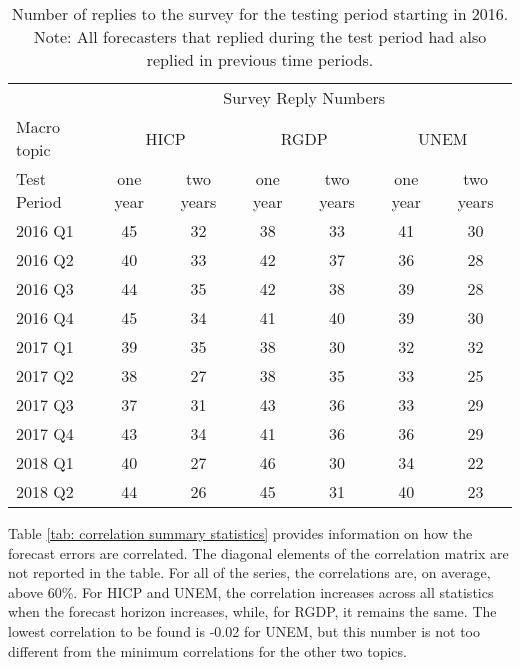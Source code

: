 \documentclass[11pt]{article}
\begin{document}
	\begin{table}[!h]
		\centering
		\caption{Number of replies to the survey for the testing period starting in 2016. Note: All forecasters that replied during the test period had also replied in previous time periods.}
		\label{tab: amount per test period}
		\begin{tabular}{lcccccc}%
			\hline
			&\multicolumn{6}{c}{Survey Reply Numbers}\\
			\cmidrule(lr){2-7}
			Macro topic & \multicolumn{2}{c}{HICP} & \multicolumn{2}{c}{RGDP} & \multicolumn{2}{c}{UNEM} \\
			\cmidrule(lr){2-3} \cmidrule(lr){4-5}\cmidrule(lr){6-7}
			Test Period     & one year & two years & one year & two years & one year & two years \\ 
			\hline
			2016 Q1      & 45    & 32    & 38    & 33    & 41    & 30    \\
			2016 Q2      & 40    & 33    & 42    & 37    & 36    & 28    \\
			2016 Q3      & 44    & 35    & 42    & 38    & 39    & 28    \\
			2016 Q4      & 45    & 34    & 41    & 40    & 39    & 30    \\
			2017 Q1      & 39    & 35    & 38    & 30    & 32    & 32    \\
			2017 Q2      & 38    & 27    & 38    & 35    & 33    & 25    \\
			2017 Q3      & 37    & 31    & 43    & 36    & 33    & 29    \\
			2017 Q4      & 43    & 34    & 41    & 36    & 36    & 29    \\
			2018 Q1      & 40    & 27    & 46    & 30    & 34    & 22    \\
			2018 Q2      & 44    & 26    & 45    & 31    & 40    & 23    \\ 
			\hline
		\end{tabular}
	\end{table}
	
	Table \ref{tab: correlation summary statistics} provides  information on how the forecast errors are correlated. The diagonal elements of the correlation matrix are not reported in the table. For all of the series, the correlations are, on average, above 60\%. For HICP and UNEM, the correlation increases across all statistics when the forecast horizon increases, while, for RGDP, it remains the same. The lowest correlation to be found is -0.02 for UNEM, but this number is not too different from the minimum correlations for the other two topics.
	
\end{document}
